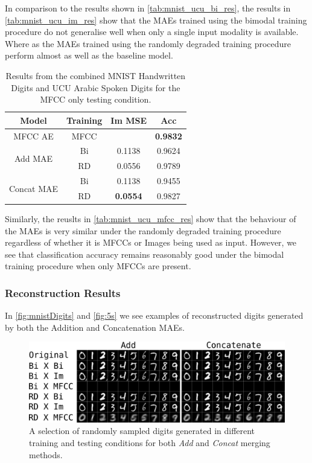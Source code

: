 In comparison to the results shown in \autoref{tab:mnist_ucu_bi_res}, the results in \autoref{tab:mnist_ucu_im_res} show that the MAEs trained using the bimodal training procedure do not generalise well when only a single input modality is available. Where as the MAEs trained using the randomly degraded training procedure perform almost as well as the baseline model. 
\begin{table}
	\centering
		\begin{tabular}{|c|c|c|c|}
		\hline
		Model & Training & Im MSE &  Acc \\ \hline
				
				MFCC AE & MFCC & 					& 	\textbf{0.9832}	\\ \hline		
\multirow{2}{*}{Add MAE} & Bi & 	0.1138			& 	0.9624 			\\ \cline{2-4}
						  & RD &	0.0556			&	0.9789			\\ \hline	
		
\multirow{2}{*}{Concat MAE} & Bi &	0.1138			&	0.9455			\\ \cline{2-4}		
							 & RD & \textbf{0.0554}	& 	0.9827 			\\ \hline
		\end{tabular}
		\caption{Results from the combined MNIST Handwritten Digits and UCU Arabic Spoken Digits for the MFCC only testing condition.}
		\label{tab:mnist_ucu_mfcc_res}

\end{table}

Similarly, the reuslts in \autoref{tab:mnist_ucu_mfcc_res} show that the behaviour of the MAEs is very similar under the randomly degraded training procedure regardless of whether it is MFCCs or Images being used as input. However, we see that classification accuracy remains reasonably good under the bimodal training procedure when only MFCCs are present. 

\subsubsection{Reconstruction Results}

In \autoref{fig:mnistDigits} and \autoref{fig:5s} we see examples of reconstructed digits generated by both the Addition and Concatenation MAEs.
\begin{figure}[h]
\begin{center}
	\includegraphics[width=\textwidth]{Figs/mnistSpoken/lbAll.png}
	\caption{A selection of randomly sampled digits generated in different training and testing conditions for both \textit{Add} and \textit{Concat} merging methods.}
	\label{fig:mnistDigits}
\end{center}
\end{figure}

